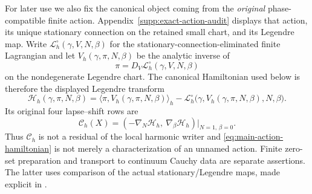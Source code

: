 \documentclass[11pt]{article}
\numberwithin{equation}{section}
\theoremstyle{definition}
\theoremstyle{remark}
\begin{document}
For later use we also fix the canonical object coming from the
\emph{original} phase-compatible finite action.  Appendix~\ref{supp:exact-action-audit}
displays that action, its unique stationary connection on the retained small
chart, and its Legendre map.  Write
$\mathscr L_h^\circ(\gamma,V,N,\beta)$ for the stationary-connection-eliminated
finite Lagrangian and let
$V_h(\gamma,\pi,N,\beta)$ be the analytic inverse of
\begin{equation}
 \pi=D_V\mathscr L_h^\circ(\gamma,V,N,\beta)
 \label{eq:main-action-legendre-map}
\end{equation}
on the nondegenerate Legendre chart.  The canonical Hamiltonian used below is
therefore the displayed Legendre transform
\begin{equation}
 \boxed{
 \mathscr H_h(\gamma,\pi,N,\beta)
 =\langle\pi,V_h(\gamma,\pi,N,\beta)\rangle_h
  -\mathscr L_h^\circ
   \bigl(\gamma,V_h(\gamma,\pi,N,\beta),N,\beta\bigr).}
 \label{eq:main-action-hamiltonian}
\end{equation}
Its original four lapse--shift rows are
\begin{equation}
 \mathscr C_h(X)=
 \left(-\nabla_N\mathscr H_h,\ \nabla_\beta\mathscr H_h\right)
       \big|_{N=1,\,\beta=0}.
 \label{eq:main-action-initial-constraints}
\end{equation}
Thus $\mathscr C_h$ is not a residual of the local harmonic writer and
\eqref{eq:main-action-hamiltonian} is not merely a characterization of an
unnamed action.  Finite zero-set preparation and transport to continuum Cauchy
data are separate assertions.  The latter uses comparison of the actual
stationary/Legendre maps, made explicit in
.
\end{document}
